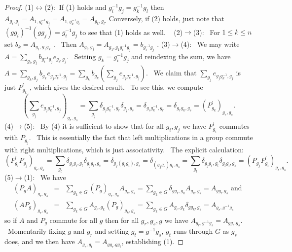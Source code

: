 \documentclass[12pt, a4paper]{amsart}
\numberwithin{equation}{section} %
\theoremstyle{plain}
\theoremstyle{definition}
\theoremstyle{plain}
\theoremstyle{remark}
\begin{document}
\begin{proof}
(1)$\leftrightarrow $(2): $\ $If (1) holds and $g_{i}^{-1}g_{j}=g_{k}^{-1}g_{l}$ then $%
A_{g_{i},g_{j}}=A_{1,g_{i}^{-1}g_{j}}=A_{1,g_{k}^{-1}g_{l}}=A_{g_{k},g_{l}%
\text{.}}$ Conversely, if (2) holds, just note that $%
(gg_{i})^{-1}(gg_{j})=g_{i}^{-1}g_{j}$ to see that (1) holds as well. \
\newline
(2)$\rightarrow $(3): \ For $1\leq k\leq n$ set $b_{k}=A_{g_{1},g_{1}g_{k}}$%
. \ Then $A_{g_{i},g_{j}}=A_{g_{1},g_{1}g_{i}^{-1}g_{j}}=b_{g_{i}^{-1}g_{j}}$%
.\newline
(3)$\rightarrow $(4): \ We may write $A=\sum%
\limits_{g_{i},g_{j}}b_{g_{i}^{-1}g_{j}}e_{g_{i},g_{j}}$. \ Setting $%
g_{k}=g_{i}^{-1}g_{j}$ and reindexing the sum, we have $A=\sum%
\limits_{g_{k},g_{j}}b_{g_{k}}e_{g_{j}g_{k}^{-1},g_{j}}=\sum%
\limits_{g_{k}}b_{g_{k}}\left(
\sum\limits_{g_{j}}e_{g_{j}g_{k}^{-1},g_{j}}\right) $. \ We claim that $%
\sum\limits_{g_{j}}e_{g_{j}g_{k}^{-1},g_{j}}$ is just $P_{g_{k}}^{\prime }$%
, which gives the desired result. \ To see this, we compute 
\[
\left( \sum\limits_{g_{j}}e_{g_{j}g_{k}^{-1},g_{j}}\right)
_{g_{r},g_{s}}=\sum\limits_{g_{j}}\delta _{g_{j}g_{k}^{-1},g_{r}}\delta
_{g_{j},g_{s}}=\delta _{g_{s}g_{k}^{-1},g_{r}}=\delta
_{g_{r}g_{k},g_{s}}=(P_{g_{k}}^{\prime })_{g_{r},g_{s}}\text{.}
\]%
\newline
(4)$\rightarrow $(5): \ By (4) it is sufficient to show that for all $%
g_{i},g_{j}$ we have $P_{g_{i}}^{\prime }$ commutes with $P_{g_{j}}$. \ This
is essentially the fact that left multiplications in a group commute with
right multiplications, which is just associativity. \ The explicit
calculation:%
\[
\left( P_{g_{i}}^{\prime }P_{g_{j}}\right)
_{g_{r},g_{s}}=\sum\limits_{g_{t}}\delta _{g_{r}g_{i},g_{t}}\delta
_{g_{j}g_{t},g_{s}}=\delta _{g_{j}(g_{r}g_{i}),g_{s}}=\delta
_{(g_{j}g_{r})g_{i},g_{s}}=\sum\limits_{g_{t}}\delta
_{g_{j}g_{r},g_{t}}\delta _{g_{t}g_{i},g_{s}}=\left(
P_{g_{j}}P_{g_{i}}^{\prime }\right) _{g_{r},g_{s}}\text{.}
\]%
\newline
(5)$\rightarrow $(1): \ We have 
\begin{eqnarray*}
\left( P_{g}A\right) _{g_{r},g_{s}} &=&\sum\limits_{g_{k}\in
G}(P_{g})_{g_{r},g_{k}}A_{g_{k},g_{s}}=\sum\limits_{g_{k}\in G}\delta
_{gg_{r},g_{k}}A_{g_{k},g_{s}}=A_{gg_{r}.g_{s}}\text{ \ and } \\
\left( AP_{g}\right) _{g_{r},g_{s}} &=&\sum\limits_{g_{k}\in
G}A_{g_{r},g_{k}}(P_{g})_{g_{k},g_{s}}=\sum\limits_{g_{k}\in
G}A_{g_{r},g_{k}}\delta _{gg_{k},g_{s}}=A_{g_{r},g^{-1}g_{s}}
\end{eqnarray*}%
\newline
so if $A$ and $P_{g}$ commute for all $g$ then for all $g_{r},g_{s},g$ we
have  $A_{g_{r},g^{-1}g_{s}}=A_{gg_{r}.g_{s}}$. \ Momentarily fixing $g$ and 
$g_{r}$ and setting $g_{t}=g^{-1}g_{s}$, $g_{t}$ runs through $G$ as $g_{s}$
does, and we then have $A_{g_{r},g_{t}}=A_{gg_{r}.gg_{t}}$, establishing (1).
\end{proof}
\end{document}
